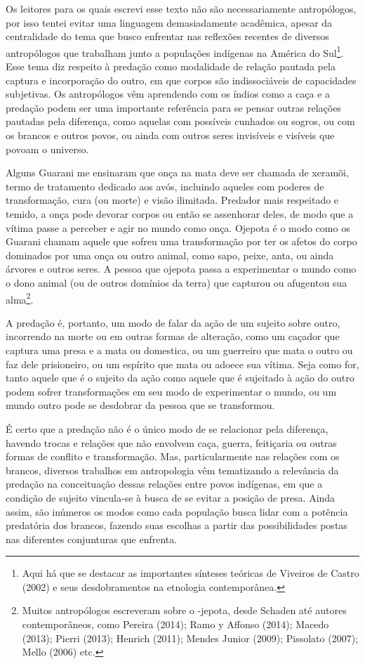 Os leitores para os quais escrevi esse texto não são necessariamente
antropólogos, por isso tentei evitar uma linguagem demasiadamente
acadêmica, apesar da centralidade do tema que busco enfrentar nas
reflexões recentes de diversos antropólogos que trabalham junto a
populações indígenas na América do Sul\footnote{Aqui há que se destacar
as importantes sínteses teóricas de Viveiros de Castro (2002) e seus
desdobramentos na etnologia contemporânea.}. Esse tema diz respeito à
predação como modalidade de relação pautada pela captura e incorporação
do outro, em que corpos são indissociáveis de capacidades subjetivas.
Os antropólogos vêm aprendendo com os índios como a caça e a predação
podem ser uma importante referência para se pensar outras relações
pautadas pela diferença, como aquelas com possíveis cunhados ou sogros,
ou com os brancos e outros povos, ou ainda com outros seres invisíveis
e visíveis que povoam o universo.

Alguns Guarani me ensinaram que onça na mata deve ser chamada de
xeramõi, termo de tratamento dedicado aos avós, incluindo aqueles com
poderes de transformação, cura (ou morte) e visão ilimitada. Predador
mais respeitado e temido, a onça pode devorar corpos ou então se
assenhorar deles, de modo que a vítima passe a perceber e agir no mundo
como onça. Ojepota é o modo como os Guarani chamam aquele que sofreu
uma transformação por ter os afetos do corpo dominados por uma onça ou
outro animal, como sapo, peixe, anta, ou ainda árvores e outros seres.
A pessoa que ojepota passa a experimentar o mundo como o dono animal
(ou de outros domínios da terra) que capturou ou afugentou sua
alma\footnote{Muitos antropólogos escreveram sobre o -jepota, desde
Schaden até autores contemporâneos, como Pereira (2014); Ramo y Affonso
(2014); Macedo (2013); Pierri (2013); Henrich (2011); Mendes Junior
(2009); Pissolato (2007); Mello (2006) etc.}.

A predação é, portanto, um modo de falar da ação de um sujeito sobre
outro, incorrendo na morte ou em outras formas de alteração, como um
caçador que captura uma presa e a mata ou domestica, ou um guerreiro
que mata o outro ou faz dele prisioneiro, ou um espírito que mata ou
adoece sua vítima. Seja como for, tanto aquele que é o sujeito da ação
como aquele que é sujeitado à ação do outro podem sofrer transformações
em seu modo de experimentar o mundo, ou um mundo outro pode se
desdobrar da pessoa que se transformou.

É certo que a predação não é o único modo de se relacionar pela
diferença, havendo trocas e relações que não envolvem caça, guerra,
feitiçaria ou outras formas de conflito e transformação. Mas,
particularmente nas relações com os brancos, diversos trabalhos em
antropologia vêm tematizando a relevância da predação na conceituação
dessas relações entre povos indígenas, em que a condição de sujeito
vincula-se à busca de se evitar a posição de presa. Ainda assim, são
inúmeros os modos como cada população busca lidar com a potência
predatória dos brancos, fazendo suas escolhas a partir das
possibilidades postas nas diferentes conjunturas que enfrenta.

